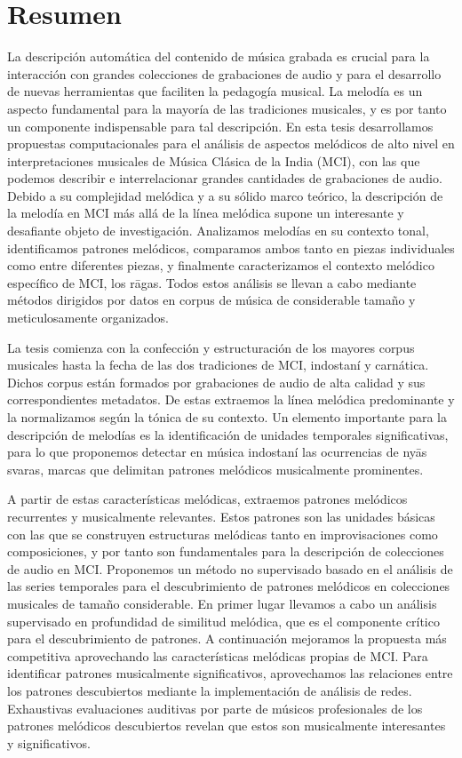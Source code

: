 
\chapter{Resumen}

La descripción automática del contenido de música grabada es crucial para la interacción con grandes colecciones de grabaciones de audio y para el desarrollo de nuevas herramientas que faciliten la pedagogía musical. La melodía es un aspecto fundamental para la mayoría de las tradiciones musicales, y es por tanto un componente indispensable para tal descripción. En esta tesis desarrollamos propuestas computacionales para el análisis de aspectos melódicos de alto nivel en interpretaciones musicales de Música Clásica de la India (MCI), con las que podemos describir e interrelacionar grandes cantidades de grabaciones de audio. Debido a su complejidad melódica y a su sólido marco teórico, la descripción de la melodía en MCI más allá de la línea melódica supone un interesante y desafiante objeto de investigación. Analizamos melodías en su contexto tonal, identificamos patrones melódicos, comparamos ambos tanto en piezas individuales como entre diferentes piezas, y finalmente caracterizamos el contexto melódico específico de MCI, los rāgas. Todos estos análisis se llevan a cabo mediante métodos dirigidos por datos en corpus de música de considerable tamaño y meticulosamente organizados.

La tesis comienza con la confección y estructuración de los mayores corpus musicales hasta la fecha de las dos tradiciones de MCI, indostaní y carnática. Dichos corpus están formados por grabaciones de audio de alta calidad y sus correspondientes metadatos. De estas extraemos la línea melódica predominante y la normalizamos según la tónica de su contexto. Un elemento importante para la descripción de melodías es la identificación de unidades temporales significativas, para lo que proponemos detectar en música indostaní las ocurrencias de nyās svaras, marcas que delimitan patrones melódicos musicalmente prominentes.

A partir de estas características melódicas, extraemos patrones melódicos recurrentes y musicalmente relevantes. Estos patrones son las unidades básicas con las que se construyen estructuras melódicas tanto en improvisaciones como composiciones, y por tanto son fundamentales para la descripción de colecciones de audio en MCI. Proponemos un método no supervisado basado en el análisis de las series temporales para el descubrimiento de patrones melódicos en colecciones musicales de tamaño considerable. En primer lugar llevamos a cabo un análisis supervisado en profundidad de similitud melódica, que es el componente crítico para el descubrimiento de patrones. A continuación mejoramos la propuesta más competitiva aprovechando las características melódicas propias de MCI. Para identificar patrones musicalmente significativos, aprovechamos las relaciones entre los patrones descubiertos mediante la implementación de análisis de redes. Exhaustivas evaluaciones auditivas por parte de músicos profesionales de los patrones melódicos descubiertos revelan que estos son musicalmente interesantes y significativos.

